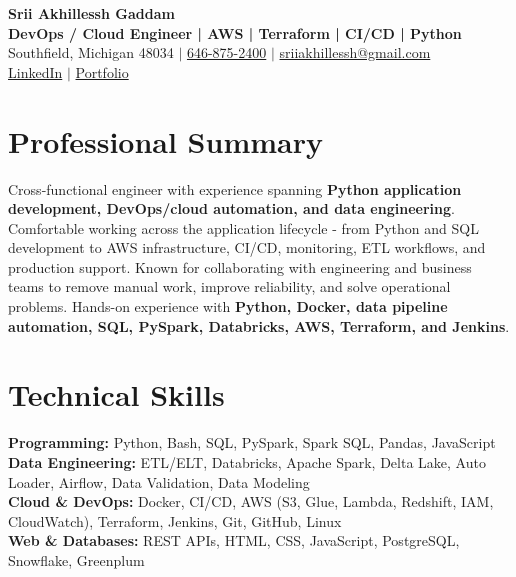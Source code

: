 \documentclass[letterpaper,10pt]{article}
\begin{document}
\fontsize{9.35pt}{10.45pt}\selectfont

\begin{center}
    {\LARGE \textbf{Srii Akhillessh Gaddam}} \\[-1pt]
    \textbf{DevOps / Cloud Engineer | AWS | Terraform | CI/CD | Python} \\[2pt]
    Southfield, Michigan 48034 $|$
    \href{tel:6468752400}{646-875-2400} $|$
    \href{mailto:sriiakhillessh@gmail.com}{sriiakhillessh@gmail.com} \\[1pt]
    \href{https://www.linkedin.com/in/srii-akhiilessh-gaddam-b48668191/}{LinkedIn} $|$
    \href{https://sriiakhillesshg.github.io/portfolio/}{Portfolio}
\end{center}
\vspace{-8pt}

\section{Professional Summary}
\small{Cross-functional engineer with experience spanning \textbf{Python application development, DevOps/cloud automation, and data engineering}. Comfortable working across the application lifecycle - from Python and SQL development to AWS infrastructure, CI/CD, monitoring, ETL workflows, and production support. Known for collaborating with engineering and business teams to remove manual work, improve reliability, and solve operational problems. Hands-on experience with \textbf{Python, Docker, data pipeline automation, SQL, PySpark, Databricks, AWS, Terraform, and Jenkins}.}

\section{Technical Skills}
\small{
\textbf{Programming:} Python, Bash, SQL, PySpark, Spark SQL, Pandas, JavaScript \\
\textbf{Data Engineering:} ETL/ELT, Databricks, Apache Spark, Delta Lake, Auto Loader, Airflow, Data Validation, Data Modeling \\
\textbf{Cloud \& DevOps:} Docker, CI/CD, AWS (S3, Glue, Lambda, Redshift, IAM, CloudWatch), Terraform, Jenkins, Git, GitHub, Linux \\
\textbf{Web \& Databases:} REST APIs, HTML, CSS, JavaScript, PostgreSQL, Snowflake, Greenplum
}
\end{document}
